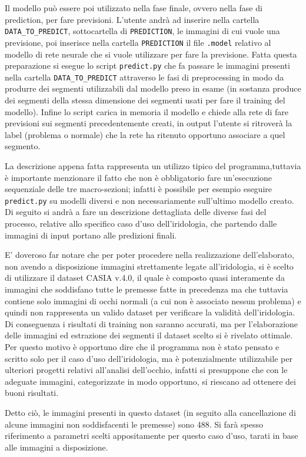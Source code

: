 Il modello può essere poi utilizzato nella fase finale, ovvero nella fase di prediction, per fare previsioni. L’utente andrà ad inserire nella cartella \texttt{DATA\_TO\_PREDICT}, sottocartella di \texttt{PREDICTION}, le immagini di cui vuole una previsione, poi inserisce nella cartella \texttt{PREDICTION} il file \texttt{.model} relativo al modello di rete neurale che si vuole utilizzare per fare la previsione. Fatta questa preparazione si esegue lo script \texttt{predict.py} che fa passare le immagini presenti nella cartella \texttt{DATA\_TO\_PREDICT} attraverso le fasi di preprocessing in modo da produrre dei segmenti utilizzabili dal modello preso in esame (in sostanza produce dei segmenti della stessa dimensione dei segmenti usati per fare il training del modello). Infine lo script carica in memoria il modello e chiede alla rete di fare previsioni sui segmenti precedentemente creati, in output l’utente si ritroverà la label (problema o normale) che la rete ha ritenuto opportuno associare a quel segmento. 

La descrizione appena fatta rappresenta un utilizzo tipico del programma,tuttavia è importante menzionare il fatto che non è obbligatorio fare un’esecuzione sequenziale delle tre macro-sezioni; infatti è possibile per esempio eseguire \texttt{predict.py} su modelli diversi e non necessariamente sull’ultimo modello creato. Di seguito si andrà a fare un descrizione dettagliata delle diverse fasi del processo, relative allo specifico caso d’uso dell’iridologia, che partendo dalle immagini di input portano alle predizioni finali. 

E’ doveroso far notare che per poter procedere nella realizzazione dell’elaborato, non avendo a disposizione immagini strettamente legate all’iridologia, si è scelto di utilizzare il dataset CASIA v.4.0, il quale è composto quasi interamente da immagini che soddisfano tutte le premesse fatte in precedenza ma che tuttavia contiene solo immagini di occhi normali (a cui non è associato nessun problema) e quindi non rappresenta un valido dataset per verificare la validità dell’iridologia. Di conseguenza i risultati di training non saranno accurati, ma per l’elaborazione delle immagini ed estrazione dei segmenti il dataset scelto si è rivelato ottimale. Per questo motivo è opportuno dire che il programma non è stato pensato e scritto solo per il caso d’uso dell’iridologia, ma è potenzialmente utilizzabile per ulteriori progetti relativi all’analisi dell’occhio, infatti si presuppone che con le adeguate immagini, categorizzate in modo opportuno, si riescano ad ottenere dei buoni risultati. 

Detto ciò, le immagini presenti in questo dataset (in seguito alla cancellazione di alcune immagini non soddisfacenti le premesse) sono 488. Si farà spesso riferimento a parametri scelti appositamente per questo caso d’uso, tarati in base alle immagini a disposizione.
